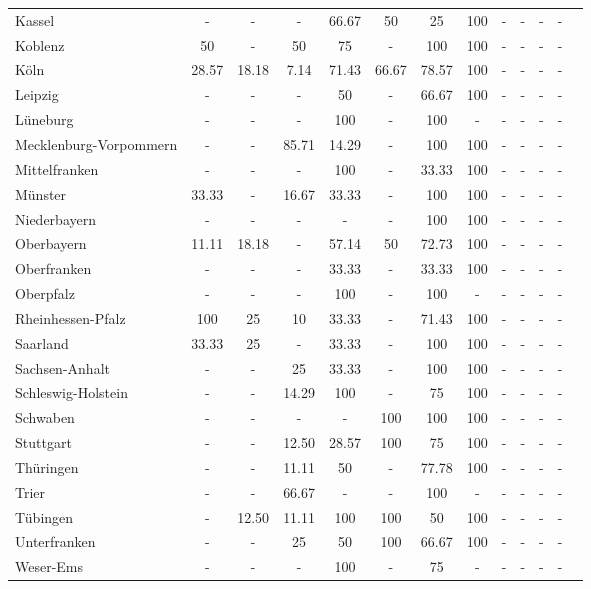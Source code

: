 \begin{table}[H]
\begin{tabularx}{\textwidth}{Xcccccccccccc}
            Kassel & - & - & - & 66.67 & 50 & 25 & 100 & - & - & - & - \\
            Koblenz & 50 & - & 50 & 75 & - & 100 & 100 & - & - & - & - \\
            Köln & 28.57 & 18.18 & 7.14 & 71.43 & 66.67 & 78.57 & 100 & - & - & - & - \\
            Leipzig & - & - & - & 50 & - & 66.67 & 100 & - & - & - & - \\
            Lüneburg & - & - & - & 100 & - & 100 & - & - & - & - & - \\
            Mecklenburg-Vorpommern & - & - & 85.71 & 14.29 & - & 100 & 100 & - & - & - & - \\
            Mittelfranken & - & - & - & 100 & - & 33.33 & 100 & - & - & - & - \\
            Münster & 33.33 & - & 16.67 & 33.33 & - & 100 & 100 & - & - & - & - \\
            Niederbayern & - & - & - & - & - & 100 & 100 & - & - & - & - \\
            Oberbayern & 11.11 & 18.18 & - & 57.14 & 50 & 72.73 & 100 & - & - & - & - \\
            Oberfranken & - & - & - & 33.33 & - & 33.33 & 100 & - & - & - & - \\
            Oberpfalz & - & - & - & 100 & - & 100 & - & - & - & - & - \\
            Rheinhessen-Pfalz & 100 & 25 & 10 & 33.33 & - & 71.43 & 100 & - & - & - & - \\
            Saarland & 33.33 & 25 & - & 33.33 & - & 100 & 100 & - & - & - & - \\
            Sachsen-Anhalt & - & - & 25 & 33.33 & - & 100 & 100 & - & - & - & - \\
            Schleswig-Holstein & - & - & 14.29 & 100 & - & 75 & 100 & - & - & - & - \\
            Schwaben & - & - & - & - & 100 & 100 & 100 & - & - & - & - \\
            Stuttgart & - & - & 12.50 & 28.57 & 100 & 75 & 100 & - & - & - & - \\
            Thüringen & - & - & 11.11 & 50 & - & 77.78 & 100 & - & - & - & - \\
            Trier & - & - & 66.67 & - & - & 100 & - & - & - & - & - \\
            Tübingen & - & 12.50 & 11.11 & 100 & 100 & 50 & 100 & - & - & - & - \\
            Unterfranken & - & - & 25 & 50 & 100 & 66.67 & 100 & - & - & - & - \\
            Weser-Ems & - & - & - & 100 & - & 75 & - & - & - & - & - \\
        \bottomrule
    \end{tabularx}
\end{table}
    